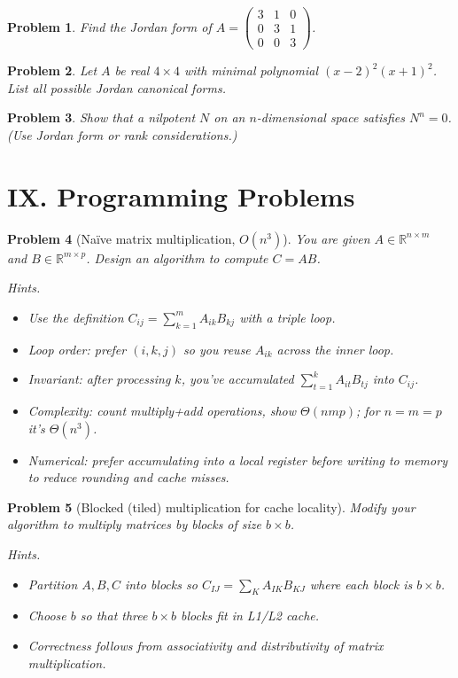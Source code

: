 \documentclass[11pt]{article}
\theoremstyle{upright}
\newtheorem{problem}{Problem}
\begin{document}
\begin{problem}
Find the Jordan form of $A=\begin{pmatrix}3&1&0\\0&3&1\\0&0&3\end{pmatrix}$.
\end{problem}

\begin{problem}
Let $A$ be real $4\times 4$ with minimal polynomial $(x-2)^2(x+1)^2$. List all possible Jordan canonical forms.
\end{problem}

\begin{problem}
Show that a nilpotent $N$ on an $n$-dimensional space satisfies $N^n=0$. (Use Jordan form or rank considerations.)
\end{problem}
\section*{IX. Programming Problems}

\begin{problem}[Naïve matrix multiplication, $O(n^3)$]
You are given $A\in\mathbb{R}^{n\times m}$ and $B\in\mathbb{R}^{m\times p}$. Design an algorithm to compute $C=AB$.

\textit{Hints.}
\begin{itemize}
  \item Use the definition $C_{ij}=\sum_{k=1}^m A_{ik}B_{kj}$ with a \emph{triple loop}.
  \item Loop order: prefer $(i,k,j)$ so you reuse $A_{ik}$ across the inner loop.
  \item Invariant: after processing $k$, you’ve accumulated $\sum_{t=1}^k A_{it}B_{tj}$ into $C_{ij}$.
  \item Complexity: count multiply+add operations, show $\Theta(nmp)$; for $n=m=p$ it’s $\Theta(n^3)$.
  \item Numerical: prefer accumulating into a local register before writing to memory to reduce rounding and cache misses.
\end{itemize}
\end{problem}

\begin{problem}[Blocked (tiled) multiplication for cache locality]
Modify your algorithm to multiply matrices by blocks of size $b\times b$.

\textit{Hints.}
\begin{itemize}
  \item Partition $A,B,C$ into blocks so $C_{IJ}=\sum_K A_{IK}B_{KJ}$ where each block is $b\times b$.
  \item Choose $b$ so that three $b\times b$ blocks fit in L1/L2 cache.
  \item Correctness follows from associativity and distributivity of matrix multiplication.
\end{itemize}
\end{problem}
\end{document}
